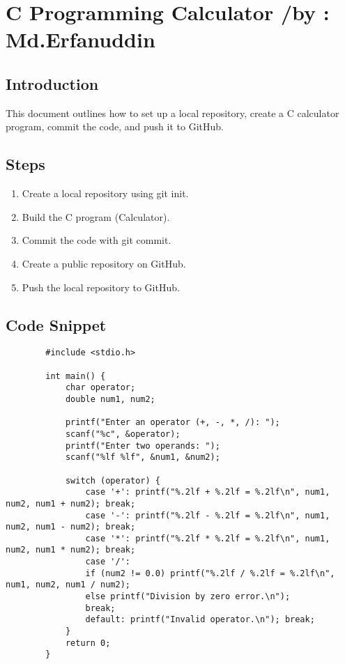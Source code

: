 \documentclass[12pt,a4paper]{article}
\begin{document}
	\newpage
	\tableofcontents
	
	\newpage
	\section{C Programming Calculator /by : Md.Erfanuddin}
	\subsection{Introduction}
	This document outlines how to set up a local repository, create a C calculator program, commit the code, and push it to GitHub.
	\subsection{Steps}
	\begin{enumerate}
		\item Create a local repository using git init.
		\item Build the C program (Calculator).
		\item Commit the code with git commit.
		\item Create a public repository on GitHub.
		\item Push the local repository to GitHub.
	\end{enumerate}
	\subsection{Code Snippet}
	\begin{verbatim}
		#include <stdio.h>
		
		int main() {
			char operator;
			double num1, num2;
			
			printf("Enter an operator (+, -, *, /): ");
			scanf("%c", &operator);
			printf("Enter two operands: ");
			scanf("%lf %lf", &num1, &num2);
			
			switch (operator) {
				case '+': printf("%.2lf + %.2lf = %.2lf\n", num1, num2, num1 + num2); break;
				case '-': printf("%.2lf - %.2lf = %.2lf\n", num1, num2, num1 - num2); break;
				case '*': printf("%.2lf * %.2lf = %.2lf\n", num1, num2, num1 * num2); break;
				case '/': 
				if (num2 != 0.0) printf("%.2lf / %.2lf = %.2lf\n", num1, num2, num1 / num2);
				else printf("Division by zero error.\n");
				break;
				default: printf("Invalid operator.\n"); break;
			}
			return 0;
		}
		
	\end{verbatim}

    
\end{document}
